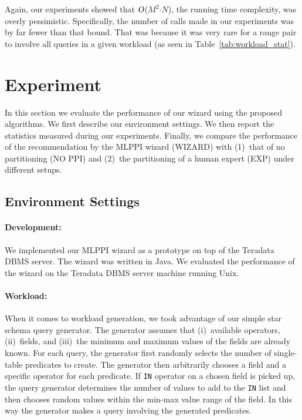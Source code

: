 \documentclass[runningheads]{comsis2}
\def\BigO{\mbox{\sl O}}
\begin{document}

Again, our experiments showed that $\BigO$($M^{2}${$\cdot$}$N$), the running time complexity, 
was overly pessimistic. Specifically, 
the number of calls made in our experiments was by far fewer than that bound. 
That was because it was very rare for a range pair to involve all queries in a given workload 
(as seen in Table~\ref{tab:workload_stat}).


\section{Experiment}
\label{sec:experiment}

In this section we evaluate the performance of our wizard using the proposed algorithms.
We first describe our environment settings. 
We then report the statistics measured during our experiments. 
Finally, we compare the performance of the recommendation 
by the MLPPI wizard (WIZARD) with (1)~that of no partitioning (NO PPI)
and (2)~the partitioning of a human expert (EXP) under different setups.

\subsection{Environment Settings}
\label{sec:env_set}

\paragraph{Development:} 
We implemented our MLPPI wizard as a prototype on top of the \hbox{Teradata} DBMS server. 
The wizard was written in Java. 
We evaluated the performance of the \hbox{wizard} 
on the Teradata DBMS server machine running Unix. 

\paragraph{Workload:} When it comes to workload generation, we took advantage of 
our simple star schema query \hbox{generator}. 
The generator assumes that (i)~available operators, (ii)~fields, 
and (iii)~the minimum and \hbox{maximum} values of the fields are already known. 
For each query, the generator first randomly selects the number of single-table 
predicates to create. 
The generator then arbitrarily chooses a field and a specific operator 
for each predicate. 
If {\tt IN} operator on a chosen field is picked up, the query generator 
determines the number of values to add to the {\tt IN} list and then chooses random values within the min-max value 
range of the field. 
In this way the generator makes a query involving the generated predicates.
\end{document}
